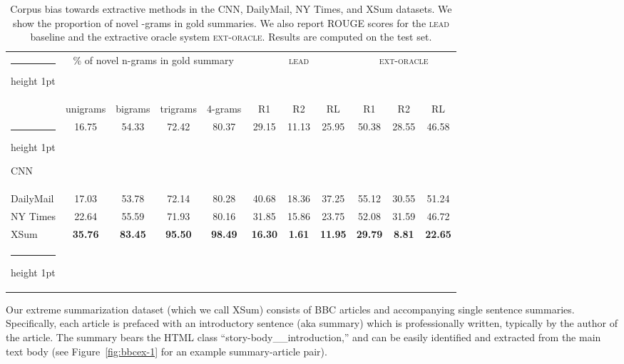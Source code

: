 \documentclass[11pt,a4paper]{article}
\makeatletter
\newcommand{\thickhline}{\noalign {\ifnum 0=`}\fi \hrule height 1pt
    \futurelet \reserved@a \@xhline
}
\makeatother
\begin{document}
\begin{table*}
  \begin{center}{\footnotesize
  \begin{tabular}{ l | c c c c | c c c | c c c } \thickhline
    \multirow{2}{*}{Datasets} & \multicolumn{4}{c|}{\% of novel n-grams in gold summary} & \multicolumn{3}{c|}{\textsc{lead}} & \multicolumn{3}{c}{\textsc{ext-oracle}} \\
    & unigrams & bigrams & trigrams & 4-grams & R1 & R2 & RL & R1 & R2 & RL \\ \thickhline 
    CNN & 16.75 & 54.33 & 72.42 & 80.37 & 29.15 & 11.13 & 25.95 & 50.38 & 28.55 & 46.58 \\
    DailyMail & 17.03 & 53.78 & 72.14 & 80.28 & 40.68 & 18.36 & 37.25 & 55.12 & 30.55 & 51.24 \\
    NY Times & 22.64 & 55.59 & 71.93 & 80.16 & 31.85 & 15.86 & 23.75 & 52.08 & 31.59 & 46.72 \\
    XSum & \textbf{35.76} & \textbf{83.45}  & \textbf{95.50}  & \textbf{98.49}  & \textbf{16.30} & \textbf{1.61}  & \textbf{11.95}  & \textbf{29.79}  & \textbf{8.81}  & \textbf{22.65}  \\ \thickhline
  \end{tabular}}
  \end{center}
  \caption{Corpus bias towards extractive methods in the CNN,
    DailyMail, NY Times, and XSum datasets.  We show  the proportion of novel -grams in gold summaries. We also report ROUGE scores  for
    the  \textsc{lead} baseline and the extractive oracle system
    \textsc{ext-oracle}.     Results
    are computed on the test set.
    \label{table:ngram-coverage-lead-oracle}}
\end{table*}





Our extreme summarization dataset (which we call XSum) consists of BBC
articles and accompanying single sentence summaries. Specifically,
each article is prefaced with an introductory sentence (aka summary)
which is professionally written, typically by the author of the
article. The summary bears the HTML class
``story-body\_\_introduction,'' and can be easily identified and
extracted from the main text body (see Figure~\ref{fig:bbcex-1} for an
example summary-article pair).
\end{document}

